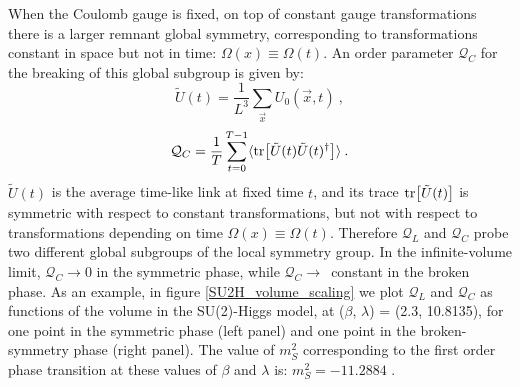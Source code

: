 When the Coulomb gauge is fixed, on top of constant gauge transformations there is a larger remnant global symmetry, corresponding to transformations constant in space but not in time: $\Omega (x) \equiv \Omega (t)$. An order parameter $\mathcal Q_C$ for the breaking of this global subgroup is given by:
\begin{equation}
\tilde U(t) = \frac{1}{L^3} \sum_{\vec x} U_{0}(\vec x,t) \: ,
\end{equation}
\begin{equation}
\mathcal Q_C = \frac{1}{T} \sum_{t=0}^{T-1} \langle \tr [\tilde U(t) \tilde U(t)^{\dagger}] \rangle \: .
\end{equation}
%
$\tilde U(t)$ is the average time-like link at fixed time $t$, and its trace $\tr [\tilde U(t)]$ is symmetric with respect to constant transformations, but not with respect to transformations depending on time $\Omega (x) \equiv \Omega (t)$. Therefore $\mathcal Q_L$ and $\mathcal Q_C$ probe two different global subgroups of the local symmetry group. In the infinite-volume limit, $\mathcal Q_C \to 0$ in the symmetric phase, while $\mathcal Q_C \to$~constant in the broken phase. As an example, in figure \ref{SU2H_volume_scaling} we plot $\mathcal Q_L$ and $\mathcal Q_C$ as functions of the volume in the SU(2)-Higgs model, at ($\beta$, $\lambda$) = (2.3, 10.8135), for one point in the symmetric phase (left panel) and one point in the broken-symmetry phase (right panel). The value of $m_S^2$ corresponding to the first order phase transition at these values of $\beta$ and $\lambda$ is: $m_S^2 = -11.2884$ \cite{Langguth:1985eu}.


